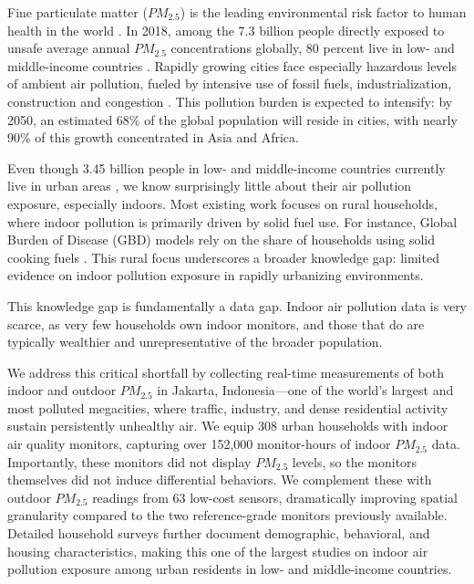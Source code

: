 \documentclass[9pt,twocolumn,twoside]{pnas-new}
\begin{document}
Fine particulate matter ($PM_{2.5}$) is the leading environmental risk factor to human health in the world \citep{health_effects_institute_state_2024}. 
In 2018, among the 7.3 billion people directly exposed to unsafe average annual $PM_{2.5}$ concentrations globally, 80 percent live in low- and middle-income countries \citep{rentschler_global_2023}. 
Rapidly growing cities face especially hazardous levels of ambient air pollution, fueled by intensive use of fossil fuels, industrialization, construction and congestion \citep{manisalidis_environmental_2020}. This pollution burden is expected to intensify: by 2050, an estimated 68\% of the global population will reside in cities, with nearly 90\% of this growth concentrated in Asia and Africa. 

Even though 3.45 billion people in low- and middle-income countries currently live in urban areas \citep{noauthor_urban_2023}, we know surprisingly little about their air pollution exposure, especially indoors. Most existing work focuses on rural households, where indoor pollution is primarily driven by solid fuel use. For instance, Global Burden of Disease (GBD) models rely on the share of households using solid cooking fuels \citep{bennitt_global_2025}. This rural focus underscores a broader knowledge gap: limited evidence on indoor pollution exposure in rapidly urbanizing environments.


This knowledge gap is fundamentally a data gap. Indoor air pollution data is very scarce, as very few households own indoor monitors, and those that do are typically wealthier and unrepresentative of the broader population. 

We address this critical shortfall by collecting real-time measurements of both indoor and outdoor $PM_{2.5}$ in Jakarta, Indonesia—one of the world’s largest and most polluted megacities, where traffic, industry, and dense residential activity sustain persistently unhealthy air. We equip 308 urban households with indoor air quality monitors, capturing over 152,000 monitor-hours of indoor $PM_{2.5}$ data. Importantly, these monitors did not display $PM_{2.5}$ levels, so the monitors themselves did not induce differential behaviors. We complement these with outdoor $PM_{2.5}$ readings from 63 low-cost sensors, dramatically improving spatial granularity compared to the two reference-grade monitors previously available. Detailed household surveys further document demographic, behavioral, and housing characteristics, making this one of the largest studies on indoor air pollution exposure among urban residents in low- and middle-income countries. 
\end{document}
